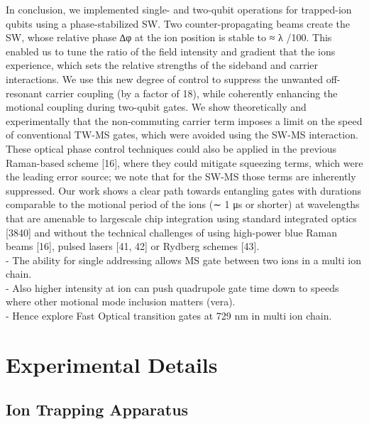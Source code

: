 \documentclass[12pt]{iopart}
\begin{document}
    In conclusion, we implemented single- and two-qubit operations for
    trapped-ion qubits using a phase-stabilized SW. Two
    counter-propagating beams create the SW, whose relative phase ∆φ at
    the ion position is stable to ≈ λ /100. This enabled us to tune the
    ratio of the field intensity and gradient that the ions experience,
    which sets the relative strengths of the sideband and carrier
    interactions. We use this new degree of control to suppress the
    unwanted off-resonant carrier coupling (by a factor of 18), while
    coherently enhancing the motional coupling during two-qubit gates. We
    show theoretically and experimentally that the non-commuting carrier
    term imposes a limit on the speed of conventional TW-MS gates, which
    were avoided using the SW-MS interaction. These optical phase control
    techniques could also be applied in the previous Raman-based scheme
    [16], where they could mitigate squeezing terms, which were the
    leading error source; we note that for the SW-MS those terms are
    inherently suppressed. Our work shows a clear path towards entangling
    gates with durations comparable to the motional period of the ions (∼
    1 μs or shorter) at wavelengths that are amenable to largescale chip
    integration using standard integrated optics [3840] and without the
    technical challenges of using high-power blue Raman beams [16], pulsed
    lasers [41, 42] or Rydberg schemes [43].\\

    - The ability for single addressing allows MS gate between two ions in a multi ion chain.\\
    - Also higher intensity at ion can push quadrupole gate time down to speeds where other motional mode inclusion matters (vera).\\
    - Hence explore Fast Optical transition gates at 729 nm in multi ion chain.\\
    

\section{Experimental Details}

\subsection{Ion Trapping Apparatus}
\end{document}
